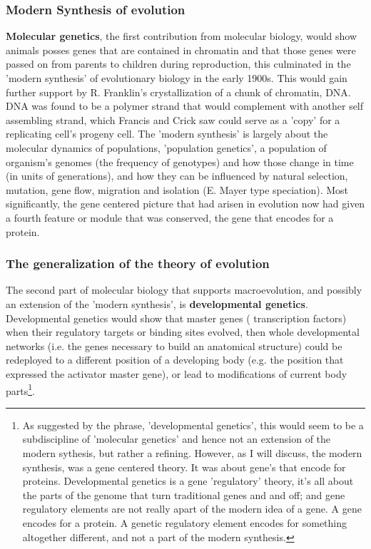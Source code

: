 \subsubsection{Modern Synthesis of evolution}

\textbf{Molecular genetics}, the first contribution from molecular biology, would show animals posses genes that are contained in chromatin and that those genes were passed on from parents to children during reproduction, this culminated in the 'modern synthesis' of evolutionary biology in the early 1900s.  This would gain further support by R. Franklin's crystallization of a chunk of chromatin, DNA.  DNA was found to be a polymer strand that would complement with another self assembling strand, which Francis and Crick saw could serve as a 'copy' for a replicating cell's progeny cell.  The 'modern synthesis' is largely about the molecular dynamics of populations, 'population genetics', a population of organism's genomes (the frequency of genotypes) and how those change in time (in units of generations), and how they can be influenced by natural selection, mutation, gene flow, migration and isolation (E. Mayer type speciation).  Most significantly, the gene centered picture that had arisen in evolution now had given a fourth feature or module that was conserved, the gene that encodes for a protein. 

\subsubsection{The generalization of the theory of evolution}

The second part of molecular biology that supports macroevolution, and possibly an extension of the 'modern synthesis', is \textbf{developmental genetics}. Developmental genetics would show that master genes ( transcription factors) when their regulatory targets or binding sites evolved, then whole developmental networks (i.e. the genes necessary to build an anatomical structure) could be redeployed to a different position of a developing body (e.g. the position that expressed the activator master gene), or lead to modifications of current body parts\footnote{As suggested by the phrase, 'developmental genetics', this would seem to be a subdiscipline of 'molecular genetics' and hence not an extension of the modern sythesis, but rather a refining.  However, as I will discuss, the modern synthesis, was a gene centered theory.  It was about gene's that encode for proteins.  Developmental genetics is a gene 'regulatory' theory, it's all about the parts of the genome that turn traditional genes and and off; and gene regulatory elements are not really apart of the modern idea of a gene.  A gene encodes for a protein.  A genetic regulatory element encodes for something altogether different, and not a part of the modern synthesis.}.  

